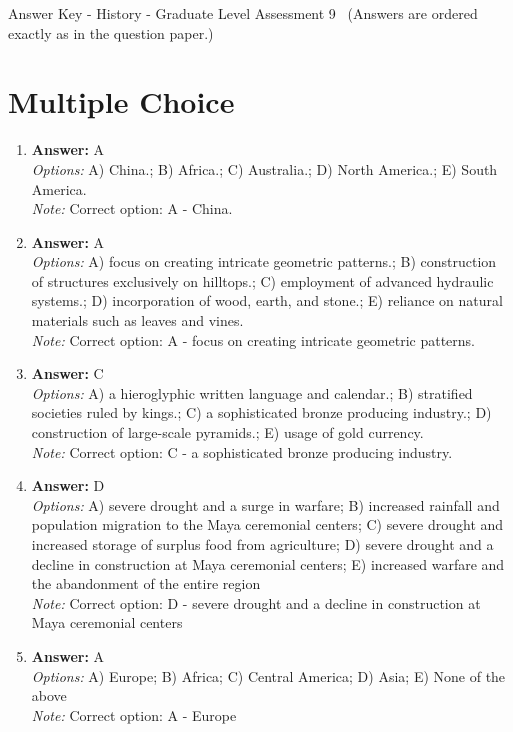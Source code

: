\documentclass[12pt]{article}
\begin{document}
\begin{center}
Answer Key - History - Graduate Level Assessment 9 \
\small (Answers are ordered exactly as in the question paper.)
\end{center}

\section*{Multiple Choice}
\begin{enumerate}[label=\arabic*.]
\item \textbf{Answer:} A
\\ \textit{Options:} A) China.; B) Africa.; C) Australia.; D) North America.; E) South America.
\\ \textit{Note:} Correct option: A - China.
\item \textbf{Answer:} A
\\ \textit{Options:} A) focus on creating intricate geometric patterns.; B) construction of structures exclusively on hilltops.; C) employment of advanced hydraulic systems.; D) incorporation of wood, earth, and stone.; E) reliance on natural materials such as leaves and vines.
\\ \textit{Note:} Correct option: A - focus on creating intricate geometric patterns.
\item \textbf{Answer:} C
\\ \textit{Options:} A) a hieroglyphic written language and calendar.; B) stratified societies ruled by kings.; C) a sophisticated bronze producing industry.; D) construction of large-scale pyramids.; E) usage of gold currency.
\\ \textit{Note:} Correct option: C - a sophisticated bronze producing industry.
\item \textbf{Answer:} D
\\ \textit{Options:} A) severe drought and a surge in warfare; B) increased rainfall and population migration to the Maya ceremonial centers; C) severe drought and increased storage of surplus food from agriculture; D) severe drought and a decline in construction at Maya ceremonial centers; E) increased warfare and the abandonment of the entire region
\\ \textit{Note:} Correct option: D - severe drought and a decline in construction at Maya ceremonial centers
\item \textbf{Answer:} A
\\ \textit{Options:} A) Europe; B) Africa; C) Central America; D) Asia; E) None of the above
\\ \textit{Note:} Correct option: A - Europe
\end{enumerate}
\end{document}
